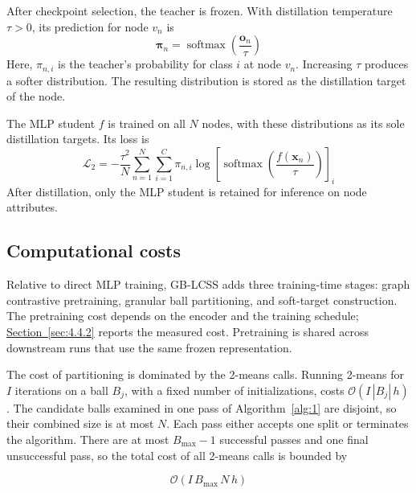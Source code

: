 \documentclass[10pt,letterpaper,nopreprintline]{elsarticle}
\theoremstyle{definition}
\theoremstyle{plain}
\begin{document}
\Needspace{64pt}
After checkpoint selection, the teacher is frozen. With distillation temperature \(\tau>0\), its prediction for node \(v_n\) is
\begin{equation}\label{eq:20}
\boldsymbol\pi_n=\operatorname{softmax}\left(\frac{\mathbf o_n}{\tau}\right)
\end{equation}
Here, \(\pi_{n,i}\) is the teacher's probability for class \(i\) at node \(v_n\). Increasing \(\tau\) produces a softer distribution. The resulting distribution is stored as the distillation target of the node.

The MLP student \(f\) is trained on all \(N\) nodes, with these distributions as its sole distillation targets. Its loss is
\begin{equation}\label{eq:21}
\mathcal L_2=-\frac{\tau^2}{N}\sum_{n=1}^{N}\sum_{i=1}^C\pi_{n,i}
\log\left[\operatorname{softmax}\left(\frac{f(\mathbf x_n)}{\tau}\right)\right]_i
\end{equation}
After distillation, only the MLP student is retained for inference on node attributes.

\subsection{Computational costs}\label{sec:3.6}

Relative to direct MLP training, GB-LCSS adds three training-time stages: graph contrastive pretraining, granular ball partitioning, and soft-target construction. The pretraining cost depends on the encoder and the training schedule; \hyperref[sec:4.4.2]{Section~\ref*{sec:4.4.2}} reports the measured cost. Pretraining is shared across downstream runs that use the same frozen representation.

\Needspace{64pt}

The cost of partitioning is dominated by the 2-means calls. Running 2-means for \(I\) iterations on a ball \(B_j\), with a fixed number of initializations, costs \(\mathcal{O}(I\,|B_j|\,h)\). The candidate balls examined in one pass of Algorithm~\ref{alg:1} are disjoint, so their combined size is at most \(N\). Each pass either accepts one split or terminates the algorithm. There are at most \(B_{\max}-1\) successful passes and one final unsuccessful pass, so the total cost of all 2-means calls is bounded by

\begin{equation}\label{eq:22}
\mathcal{O}(I\,B_{\max}\,N\,h)
\end{equation}
\end{document}
